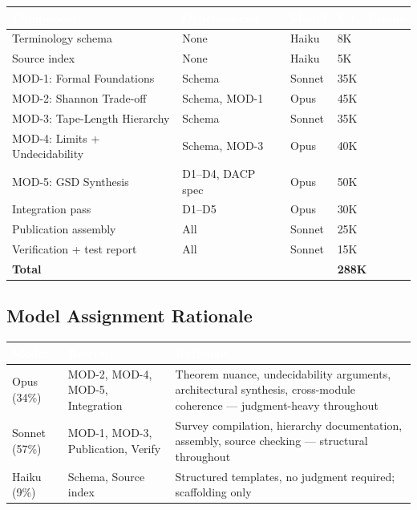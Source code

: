 \documentclass[11pt,letterpaper]{article}
\newcommand{\tableheader}[1]{\textbf{\sffamily\textcolor{white}{#1}}}
\begin{document}
\begin{center}
\begin{tabularx}{\textwidth}{L{3.5cm}L{3cm}C{2cm}C{2.5cm}}
\toprule
{}
\tableheader{Component} & \tableheader{Dependencies} & \tableheader{Model} & \tableheader{Est.\ Tokens} \\
\midrule
Terminology schema & None & Haiku & 8K \\
Source index & None & Haiku & 5K \\
MOD-1: Formal Foundations & Schema & Sonnet & 35K \\
MOD-2: Shannon Trade-off & Schema, MOD-1 & Opus & 45K \\
MOD-3: Tape-Length Hierarchy & Schema & Sonnet & 35K \\
MOD-4: Limits + Undecidability & Schema, MOD-3 & Opus & 40K \\
MOD-5: GSD Synthesis & D1--D4, DACP spec & Opus & 50K \\
Integration pass & D1--D5 & Opus & 30K \\
Publication assembly & All & Sonnet & 25K \\
Verification + test report & All & Sonnet & 15K \\
\midrule
\textbf{Total} & & & \textbf{288K} \\
\bottomrule
\end{tabularx}
\end{center}

\subsection{Model Assignment Rationale}

\begin{center}
\begin{tabularx}{\textwidth}{L{2.5cm}L{3cm}X}
\toprule
{}
\tableheader{Model} & \tableheader{Role(s)} & \tableheader{Rationale} \\
\midrule
Opus (34\%) & MOD-2, MOD-4, MOD-5, Integration & Theorem nuance, undecidability arguments, architectural synthesis, cross-module coherence --- judgment-heavy throughout \\
Sonnet (57\%) & MOD-1, MOD-3, Publication, Verify & Survey compilation, hierarchy documentation, assembly, source checking --- structural throughout \\
Haiku (9\%) & Schema, Source index & Structured templates, no judgment required; scaffolding only \\
\bottomrule
\end{tabularx}
\end{center}
\end{document}
